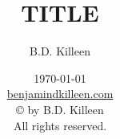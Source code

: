\usepackage{setspace}
\usepackage{hyperref}
\usepackage{textcomp}
\usepackage{graphicx}
\graphicspath{ {images/} }
\usepackage{float}
\usepackage{chemformula}
\usepackage{xcolor}
\usepackage{titlesec}

\newcommand{\todo}[1]{{\color{red} [TODO: #1]}}

\newcommand{\scene}{
  \begin{center}--- --- ---
\end{center}}

\newcommand{\quickwordcount}[1]{%
  \immediate\write18{texcount -1 -merge -sum -q #1.tex > #1-words.sum}%
}

\hfuzz=5.002pt

\title{TITLE}
\author{B.D. Killeen}
\date{                          %
  \today\\
  \href{https://benjamindkilleen.com}{benjamindkilleen.com} \\
  \vfill
  \normalsize
  \copyright{ }\the\year{} by B.D. Killeen\\
  All rights reserved.
}

\usepackage{fancyhdr}
\pagestyle{fancy}
\setlength{\headheight}{14.5pt}



\frontmatter{}
\singlespacing{}
\maketitle


\mainspacing{}

\mainmatter{}



% 



